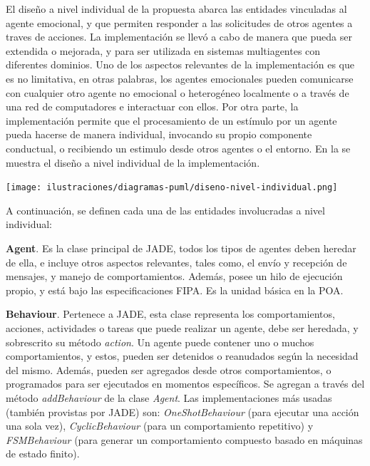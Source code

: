 
El diseño a nivel individual de la propuesta abarca las entidades
vinculadas al agente emocional, y que permiten responder
a las solicitudes de otros agentes a traves de acciones.
La implementación se llevó a cabo de manera que pueda ser extendida o mejorada,
y para ser utilizada en sistemas multiagentes con diferentes dominios.
Uno de los aspectos relevantes de la implementación es que es no limitativa,
en otras palabras, los agentes emocionales pueden comunicarse con cualquier otro agente no emocional
o heterogéneo localmente o a través de una red de computadores e interactuar con ellos.
Por otra parte, la implementación permite que el procesamiento de un estímulo por un agente
pueda hacerse de manera individual, invocando su propio componente conductual, o
recibiendo un estimulo desde otros agentes o el entorno.
En la 
se muestra el diseño a nivel individual de la implementación.

\begin{ilustracion}[fuente=\yo, etiqueta=diseno-nivel-individual, titulo={Diseño de la Implementación a Nivel Individual}]
\texttt{[image: ilustraciones/diagramas-puml/diseno-nivel-individual.png]}
\end{ilustracion}

A continuación, se definen cada una de las entidades involucradas a
nivel individual:

\textbf{Agent}. Es la clase principal de JADE, todos los tipos de agentes deben
heredar de ella, e incluye otros aspectos relevantes, tales como, el envío y
recepción de mensajes, y manejo de comportamientos. Además, posee un hilo de
ejecución propio, y está bajo las especificaciones FIPA. Es la unidad básica en
la POA.

\textbf{Behaviour}. Pertenece a JADE, esta clase representa los
comportamientos, acciones, actividades o tareas que puede realizar un agente, debe
ser heredada, y sobrescrito su método \textit{action}. Un agente puede
contener uno o muchos comportamientos, y estos, pueden ser detenidos o
reanudados según la necesidad del mismo. Además, pueden ser agregados desde
otros comportamientos, o programados para ser ejecutados en momentos
específicos. Se agregan a través del método \textit{addBehaviour} de la clase
\textit{Agent}. Las implementaciones más usadas (también provistas por JADE) son:
\textit{OneShotBehaviour} (para ejecutar una acción una sola vez),
\textit{CyclicBehaviour} (para un comportamiento repetitivo) y
\textit{FSMBehaviour} (para generar un comportamiento compuesto basado en
máquinas de estado finito).


